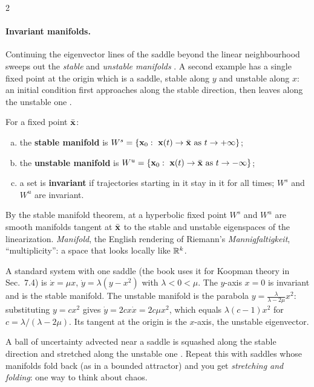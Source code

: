 \begin{paracol}{2}
\paragraph{Invariant manifolds.} Continuing the eigenvector lines of the saddle beyond the linear
neighbourhood sweeps out the \emph{stable} and \emph{unstable manifolds} . A second
example has a single fixed point at the origin which is a saddle, stable along $y$ and unstable along
$x$: an initial condition first approaches along the stable direction, then leaves along the unstable
one .

\begin{definition}
For a fixed point $\bar{\mathbf{x}}$:
\begin{enumerate}[(a)]
  \item the \textbf{stable manifold} is $W^s=\{\mathbf{x}_0:\ \mathbf{x}(t)\to\bar{\mathbf{x}}\text{ as }t\to+\infty\}$;
  \item the \textbf{unstable manifold} is $W^u=\{\mathbf{x}_0:\ \mathbf{x}(t)\to\bar{\mathbf{x}}\text{ as }t\to-\infty\}$;
  \item a set is \textbf{invariant} if trajectories starting in it stay in it for all times; $W^s$ and
        $W^u$ are invariant.
\end{enumerate}
By the stable manifold theorem, at a hyperbolic fixed point $W^s$ and $W^u$ are smooth manifolds tangent
at $\bar{\mathbf{x}}$ to the stable and unstable eigenspaces of the linearization. \emph{Manifold}, the
English rendering of Riemann's \emph{Mannigfaltigkeit}, ``multiplicity'': a space that looks locally
like $\mathbb{R}^k$.
\end{definition}

\begin{example}\label{ex:fu-saddle}
A standard system with one saddle (the book uses it for Koopman theory in Sec.~7.4) is
$\dot x=\mu x$, $\dot y=\lambda(y-x^2)$ with $\lambda<0<\mu$. The $y$-axis $x=0$ is invariant and is
the stable manifold. The unstable manifold is the parabola $y=\frac{\lambda}{\lambda-2\mu}x^2$:
substituting $y=cx^2$ gives $\dot y=2cx\dot x=2c\mu x^2$, which equals $\lambda(c-1)x^2$ for
$c=\lambda/(\lambda-2\mu)$. Its tangent at the origin is the $x$-axis, the unstable eigenvector.
\end{example}

\begin{intuition}
A ball of uncertainty advected near a saddle is squashed along the stable direction and stretched
along the unstable one . Repeat this with saddles whose manifolds
fold back (as in a bounded attractor) and you get \emph{stretching and folding}: one way to think
about chaos.
\end{intuition}


\end{paracol}
